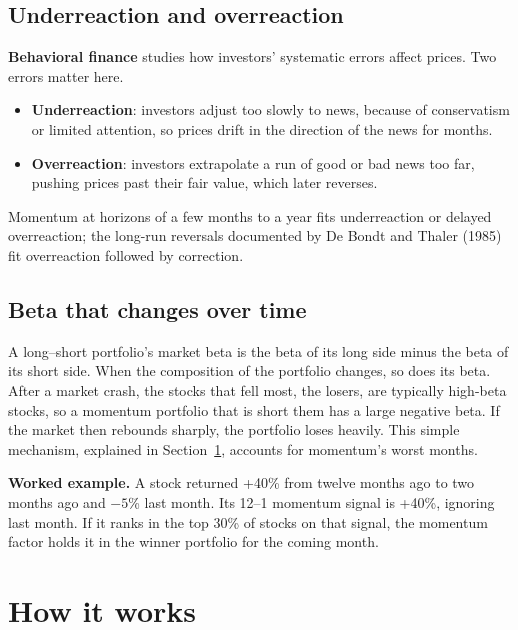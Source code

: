 \subsection{Underreaction and overreaction}
\label{sec:09-behavior}

\textbf{Behavioral finance} studies how investors' systematic errors affect prices. Two errors matter here.

\begin{itemize}
  \item \textbf{Underreaction}: investors adjust too slowly to news, because of conservatism or limited attention, so prices drift in the direction of the news for months.
  \item \textbf{Overreaction}: investors extrapolate a run of good or bad news too far, pushing prices past their fair value, which later reverses.
\end{itemize}

Momentum at horizons of a few months to a year fits underreaction or delayed overreaction; the long-run reversals documented by De Bondt and Thaler (1985) fit overreaction followed by correction.

\subsection{Beta that changes over time}

A long--short portfolio's market beta is the beta of its long side minus the beta of its short side. When the composition of the portfolio changes, so does its beta. After a market crash, the stocks that fell most, the losers, are typically high-beta stocks, so a momentum portfolio that is short them has a large negative beta. If the market then rebounds sharply, the portfolio loses heavily. This simple mechanism, explained in Section~\ref{sec:09-how}, accounts for momentum's worst months.

\textbf{Worked example.} A stock returned +40\% from twelve months ago to two months ago and $-5$\% last month. Its 12--1 momentum signal is +40\%, ignoring last month. If it ranks in the top 30\% of stocks on that signal, the momentum factor holds it in the winner portfolio for the coming month.

\section{How it works}
\label{sec:09-how}

